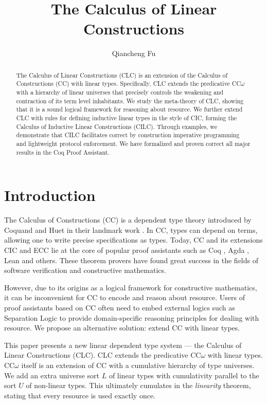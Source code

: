 \documentclass[sigplan,screen,review,anonymous]{acmart}
\title{The Calculus of Linear Constructions}
\author{Qiancheng Fu}
\affiliation{
  \institution{Boston University}
  \city{Boston}
  \state{MA}
  \country{USA}
}
\begin{document}
\begin{abstract}
  The Calculus of Linear Constructions (CLC) is an extension of the Calculus of Constructions (CC) with linear types. Specifically, CLC extends the predicative CC$\omega$ with a hierarchy of linear universes that precisely controls the weakening and contraction of its term level inhabitants. We study the meta-theory of CLC, showing that it is a sound logical framework for reasoning about resource. We further extend CLC with rules for defining inductive linear types in the style of CIC, forming the Calculus of Inductive Linear Constructions (CILC). Through examples, we demonstrate that CILC facilitates correct by construction imperative programming and lightweight protocol enforcement. We have formalized and proven correct all major results in the Coq Proof Assistant.
\end{abstract}
\maketitle

\section{Introduction}
The Calculus of Constructions (CC) is a dependent type theory introduced by Coquand and Huet in their landmark work \cite{cc}. In CC, types can depend on terms, allowing one to write precise specifications as types. Today, CC and its extensions CIC \cite{cic} and ECC \cite{ecc} lie at the core of popular proof assistants such as Coq \cite{coq}, Agda \cite{agda}, Lean \cite{lean} and others. These theorem provers have found great success in the fields of software verification and constructive mathematics.

However, due to its origins as a logical framework for constructive mathematics, it can be inconvenient for CC to encode and reason about resource. Users of proof assistants based on CC often need to embed external logics such as Separation Logic to provide domain-specific reasoning principles for dealing with resource. We propose an alternative solution: extend CC with linear types.

This paper presents a new linear dependent type system --- the Calculus of Linear Constructions (CLC). CLC extends the predicative CC$\omega$ with linear types. CC$\omega$ itself is an extension of CC with a cumulative hierarchy of type universes. We add an extra universe sort $L$ of linear types with cumulativity parallel to the sort $U$ of non-linear types. This ultimately cumulates in the \textit{linearity} theorem, stating that every resource is used exactly once.
\end{document}
